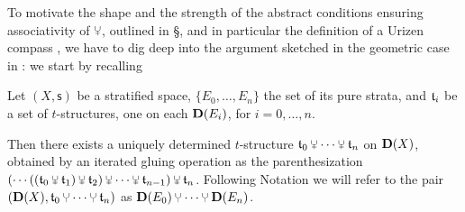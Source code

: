 To motivate the shape and the strength of the abstract conditions ensuring associativity of $\glue$, outlined in \S{}, and in particular the definition of a Urizen compass , we have to dig deep into the argument sketched in the geometric case in \cite[\textbf{2.1.2-3}]{BBDPervers}: we start by recalling
\begin{theorem}\cite[p. \textbf{158}]{Banagl}\label{geomgluing}
Let $(X, \textsf{s})$ be a stratified space, $\{E_0,\dots, E_n\}$ the set of its pure strata, and $\mathfrak{t}_i$ be a set of $t$\hyp{}structures, one on each $\mathbf{D}(E_i)$, for $i=0,\dots, n$.

Then there exists a uniquely determined $t$\hyp{}structure $\tee_0\glue \cdots \glue \tee_n$ on $\mathbf{D}(X)$, obtained by an iterated gluing operation as the parenthesization 
$(\cdots ((\tee_0\glue \tee_1)\glue \tee_2) \glue  \cdots\glue  \tee_{n-1})\glue \tee_n$. Following Notation  we will refer to the pair $(\D(X), \tee_0\glue \cdots \glue \tee_n)$ as $\D(E_0)\glue \cdots \glue \D(E_n)$.
\end{theorem}
